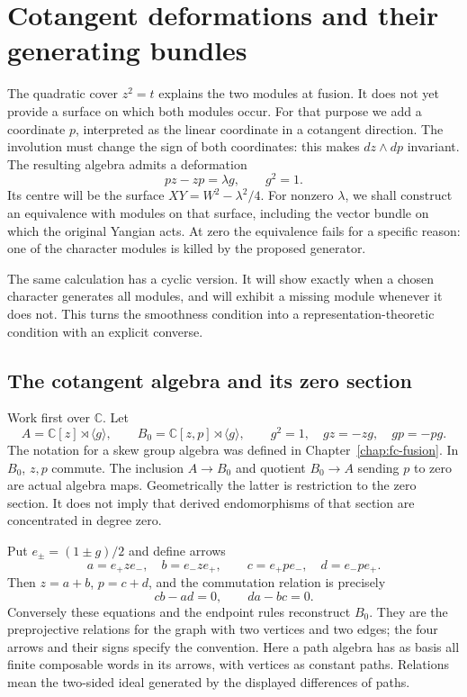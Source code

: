 \chapter{Cotangent deformations and their generating bundles}
\label{chap:cs-surfaces}

The quadratic cover \(z^2=t\) explains the two modules at fusion.
It does not yet provide a surface on which both modules occur.
For that purpose we add a coordinate \(p\), interpreted as the linear
coordinate in a cotangent direction. The involution must change the
sign of both coordinates: this makes \(dz\wedge dp\) invariant.
The resulting algebra admits a deformation
\[
 pz-zp=\lambda g,\qquad g^2=1.
\]
Its centre will be the surface \(XY=W^2-\lambda^2/4\).
For nonzero \(\lambda\), we shall construct an equivalence with modules
on that surface, including the vector bundle on which the original
Yangian acts. At zero the equivalence fails for a specific reason:
one of the character modules is killed by the proposed generator.

The same calculation has a cyclic version. It will show exactly when
a chosen character generates all modules, and will exhibit a missing
module whenever it does not. This turns the smoothness condition into
a representation-theoretic condition with an explicit converse.

\section{The cotangent algebra and its zero section}

Work first over \(\mathbb C\). Let
\[
 A=\mathbb C[z]\rtimes\langle g\rangle,\qquad
 B_0=\mathbb C[z,p]\rtimes\langle g\rangle,
 \qquad g^2=1,\quad gz=-zg,\quad gp=-pg.
\]
The notation for a skew group algebra was defined in
Chapter~\ref{chap:fc-fusion}. In \(B_0\), \(z,p\) commute.
The inclusion \(A\to B_0\) and quotient \(B_0\to A\) sending \(p\)
to zero are actual algebra maps. Geometrically the latter is restriction
to the zero section. It does not imply that derived endomorphisms of
that section are concentrated in degree zero.

Put \(e_\pm=(1\pm g)/2\) and define arrows
\[
 a=e_+ze_-,\quad b=e_-ze_+,\qquad
 c=e_+pe_-,\quad d=e_-pe_+.
\]
Then \(z=a+b\), \(p=c+d\), and the commutation relation is precisely
\begin{equation}\label{eq:cs-preprojective}
 cb-ad=0,\qquad da-bc=0.
\end{equation}
Conversely these equations and the endpoint rules reconstruct \(B_0\).
They are the preprojective relations for the graph with two vertices
and two edges; the four arrows and their signs specify the convention.
Here a path algebra has as basis all finite composable words in its
arrows, with vertices as constant paths. Relations mean the two-sided
ideal generated by the displayed differences of paths.

